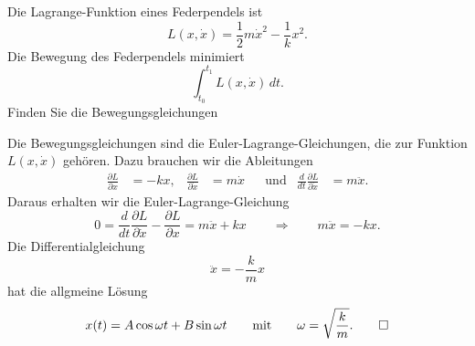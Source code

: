 Die Lagrange-Funktion eines Federpendels ist
\[
L(x,\dot x) = \frac12m\dot x^2 - \frac1kx^2.
\]
Die Bewegung des Federpendels minimiert
\[
\int_{t_0}^{t_1} L(x,\dot x)\,dt.
\]
Finden Sie die Bewegungsgleichungen

\begin{loesung}
Die Bewegungsgleichungen sind die Euler-Lagrange-Gleichungen, die zur
Funktion $L(x,\dot x)$ gehören.
Dazu brauchen wir die Ableitungen
\[
\begin{aligned}
\frac{\partial L}{\partial x}
&=
-kx,
&
\frac{\partial L}{\partial \dot x}
&=
m\dot x
&&\text{und}&
\frac{d}{dt}\frac{\partial L}{\partial\dot x}
&=
m\ddot x.
\end{aligned}
\]
Daraus erhalten wir die Euler-Lagrange-Gleichung
\[
0
=
\frac{d}{dt}\frac{\partial L}{\partial\dot x}
-\frac{\partial L}{\partial x}
=
m\ddot x+kx
\qquad\Rightarrow\qquad
m\ddot x=-kx.
\]
Die Differentialgleichung
\[
\ddot x = -\frac{k}{m}x
\]
hat die allgmeine Lösung
\[
x(t)=A\cos\omega t + B\sin\omega t
\qquad\text{mit}\qquad
\omega=\sqrt{\frac{k}{m}}.
\qedhere
\]
\end{loesung}

